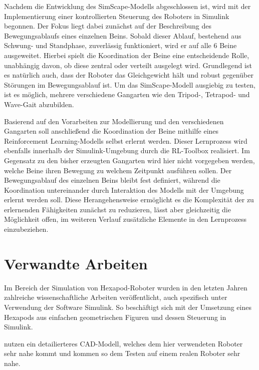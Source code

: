 Nachdem die Entwicklung des SimScape-Modells abgeschlossen ist, wird mit der Implementierung einer kontrollierten Steuerung des Roboters in Simulink begonnen.
Der Fokus liegt dabei zunächst auf der Beschreibung des Bewegungsablaufs eines einzelnen Beins.
Sobald dieser Ablauf, bestehend aus Schwung- und Standphase, zuverlässig funktioniert, wird er auf alle 6 Beine ausgeweitet.
Hierbei spielt die Koordination der Beine eine entscheidende Rolle, unabhängig davon, ob diese zentral oder verteilt ausgelegt wird.
Grundlegend ist es natürlich auch, dass der Roboter das Gleichgewicht hält und robust gegenüber Störungen im Bewegungsablauf ist.
Um das SimScape-Modell ausgiebig zu testen, ist es möglich, mehrere verschiedene Gangarten wie den Tripod-, Tetrapod- und Wave-Gait abzubilden.

Basierend auf den Vorarbeiten zur Modellierung und den verschiedenen Gangarten soll anschließend die Koordination der Beine mithilfe eines Reinforcement Learning-Modells selbst erlernt werden.
Dieser Lernprozess wird ebenfalls innerhalb der Simulink-Umgebung durch die RL-Toolbox realisiert.
Im Gegensatz zu den bisher erzeugten Gangarten wird hier nicht vorgegeben werden, welche Beine ihren Bewegung zu welchem Zeitpunkt ausführen sollen.
Der Bewegungsablauf des einzelnen Beins bleibt fest definiert, während die Koordination untereinander durch Interaktion des Modells mit der Umgebung erlernt werden soll. 
Diese Herangehensweise ermöglicht es die Komplexität der zu erlernenden Fähigkeiten zunächst zu reduzieren, lässt aber gleichzeitig die Möglichkeit offen, im weiteren Verlauf zusätzliche Elemente in den Lernprozess einzubeziehen.


\section{Verwandte Arbeiten}

Im Bereich der Simulation von Hexapod-Roboter wurden in den letzten Jahren zahlreiche wissenschaftliche Arbeiten veröffentlicht, auch spezifisch unter Verwendung der Software Simulink.
So beschäftigt sich \parencite{HexapodRobotSimscapeMultibody} mit der Umsetzung eines Hexapods aus einfachen geometrischen Figuren und dessen Steuerung in Simulink.

\parencite{DynamicModelingAndControlMatlabSimMechanics} nutzen ein detailierteres CAD-Modell, welches dem hier verwendeten Roboter sehr nahe kommt und kommen so dem Testen auf einem realen Roboter sehr nahe.

